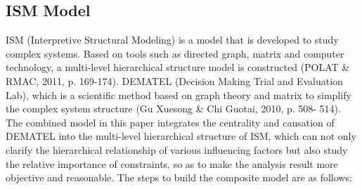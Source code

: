 \documentclass[12pt]{article}  %
\begin{document}
\subsection{ISM Model}
ISM (Interpretive Structural Modeling) is a model that is developed to study complex systems. 
Based on tools such as directed graph, matrix and computer technology, a multi-level 
hierarchical structure model is constructed (POLAT \& RMAC, 2011, p. 169-174). DEMATEL 
(Decision Making Trial and Evaluation Lab), which is a scientific method based on graph theory 
and matrix to simplify the complex system structure (Gu Xuesong \& Chi Guotai, 2010, p. 508-
514). The combined model in this paper integrates the centrality and causation of DEMATEL 
into the multi-level hierarchical structure of ISM, which can not only clarify the hierarchical 
relationship of various influencing factors but also study the relative importance of constraints, 
so as to make the analysis result more objective and reasonable.
The steps to build the composite model are as follows:
\end{document}
